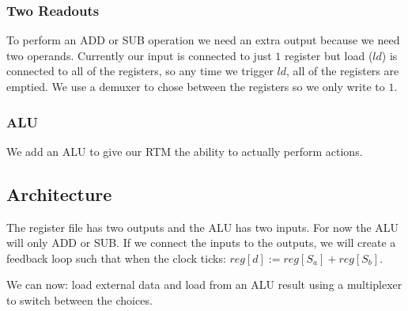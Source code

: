 \subsubsection{Two Readouts}\label{ssub:two_readouts}

To perform an ADD or SUB operation we need an extra output because we need two operands.
Currently our input is connected to just \(1\) register but load (\(ld\)) is connected to all of the registers, so any time we trigger \(ld\), all of the registers are emptied.
We use a demuxer to chose between the registers so we only write to \(1\).

\subsubsection{ALU}\label{ssub:alu}

We add an ALU to give our RTM the ability to actually perform actions.

\subsection{Architecture}\label{sub:architecture}

The register file has two outputs and the ALU has two inputs.
For now the ALU will only ADD or SUB.
If we connect the inputs to the outputs, we will create a feedback loop such that when the clock ticks: \(reg[d] := reg[S_a] + reg[S_b]\).

We can now: load external data and load from an ALU result using a multiplexer to switch between the choices.

